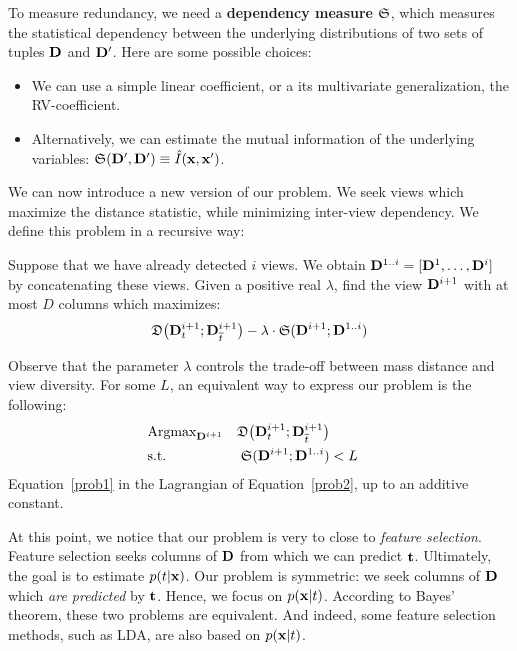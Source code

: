 To measure redundancy, we need a \textbf{dependency measure} $\mathfrak{S}$, which
measures the statistical dependency between the underlying distributions of two
sets of tuples $\mathbf{D}$ and $\mathbf{D}'$.  Here are some possible choices:
\begin{itemize}
    \item We can use a simple linear coefficient, or a its multivariate
        generalization, the RV-coefficient.
    \item Alternatively, we can estimate the mutual information of the
        underlying variables:
        $\mathfrak{S}(\mathbf{D}', \mathbf{D}') \equiv \hat{I}(\mathbf{x}, \mathbf{x'})$.
\end{itemize}
We can now introduce a new version of our problem. We seek views
which maximize the distance statistic, while minimizing inter-view dependency.
We define this problem in a recursive way:
\begin{problem}
    Suppose that we have already detected $i$ views. We obtain $\mathbf{D}^{1..i} =
    [\mathbf{D}^1, \ldots, \mathbf{D}^i]$ by concatenating these views.  Given a
    positive real $\lambda$, find the view $\mathbf{D}^{i+1}$ with at most $D$
    columns which maximizes:
        \begin{equation}
            \label{prob1}
            \mathfrak{D}\big( \mathbf{D}^{i+1}_t  ; \mathbf{D}^{i+1}_{\overline{t}} \big) - 
            \lambda \cdot \mathfrak{S} ( \mathbf{D}^{i+1} ; \mathbf{D}^{1..i})
        \end{equation}
\end{problem}
Observe that the parameter $\lambda$ controls the trade-off between mass distance
and view diversity. For some $L$, an equivalent way to express our problem is
the following:
\begin{equation}
    \label{prob2}
    \begin{aligned}
        & \text{Argmax}_{\mathbf{D}^{i+1}} 
            & \mathfrak{D}\big( \mathbf{D}^{i+1}_t  ; \mathbf{D}^{i+1}_{\overline{t}} \big)\\
        & \text{s.t.} 
        &\mathfrak{S} ( \mathbf{D}^{i+1} ; \mathbf{D}^{1..i}) & < L\\ 
    \end{aligned}
\end{equation}
Equation~\ref{prob1} in the Lagrangian of Equation~\ref{prob2}, up to an
additive constant.

At this point, we notice that our problem is very to close to \emph{feature
selection}. Feature selection seeks columns of $\mathbf{D}$ from which we can
predict $\mathbf{t}$. Ultimately, the goal is to estimate $p(t|\mathbf{x})$. Our
problem is symmetric: we seek columns of $\mathbf{D}$ which \emph{are predicted} by
$\mathbf{t}$.  Hence, we focus on $p(\mathbf{x}|t)$. According to Bayes' theorem, these
two problems are equivalent. And indeed, some feature selection methods, such
as LDA, are also based on $p(\mathbf{x}|t)$.

